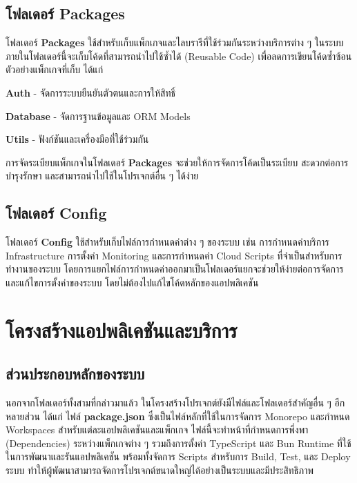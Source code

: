 \subsection{โฟลเดอร์ Packages}
\hspace*{1.5em}
โฟลเดอร์ \textbf{Packages} ใช้สำหรับเก็บแพ็กเกจและไลบรารีที่ใช้ร่วมกันระหว่างบริการต่าง ๆ ในระบบ ภายในโฟลเดอร์นี้จะเก็บโค้ดที่สามารถนำไปใช้ซ้ำได้ (Reusable Code) เพื่อลดการเขียนโค้ดซ้ำซ้อน 
ตัวอย่างแพ็กเกจที่เก็บ ได้แก่
\begin{mycustomenum2}
  \item \textbf{Auth} - จัดการระบบยืนยันตัวตนและการให้สิทธิ์
  \item \textbf{Database} - จัดการฐานข้อมูลและ ORM Models
  \item \textbf{Utils} - ฟังก์ชันและเครื่องมือที่ใช้ร่วมกัน
\end{mycustomenum2}
\hspace*{1.5em}
การจัดระเบียบแพ็กเกจในโฟลเดอร์ \textbf{Packages} จะช่วยให้การจัดการโค้ดเป็นระเบียบ สะดวกต่อการบำรุงรักษา และสามารถนำไปใช้ในโปรเจกต์อื่น ๆ ได้ง่าย

\subsection{โฟลเดอร์ Config}
\hspace*{1.5em}
โฟลเดอร์ \textbf{Config} ใช้สำหรับเก็บไฟล์การกำหนดค่าต่าง ๆ ของระบบ เช่น การกำหนดค่าบริการ Infrastructure การตั้งค่า Monitoring และการกำหนดค่า Cloud Scripts ที่จำเป็นสำหรับการทำงานของระบบ โดยการแยกไฟล์การกำหนดค่าออกมาเป็นโฟลเดอร์แยกจะช่วยให้ง่ายต่อการจัดการและแก้ไขการตั้งค่าของระบบ โดยไม่ต้องไปแก้ไขโค้ดหลักของแอปพลิเคชัน

\section{โครงสร้างแอปพลิเคชันและบริการ}
\subsection{ส่วนประกอบหลักของระบบ}
\hspace*{1.5em}
นอกจากโฟลเดอร์ทั้งสามที่กล่าวมาแล้ว ในโครงสร้างโปรเจกต์ยังมีไฟล์และโฟลเดอร์สำคัญอื่น ๆ อีกหลายส่วน ได้แก่ ไฟล์ \textbf{package.json} ซึ่งเป็นไฟล์หลักที่ใช้ในการจัดการ Monorepo และกำหนด Workspaces สำหรับแต่ละแอปพลิเคชันและแพ็กเกจ 
ไฟล์นี้จะทำหน้าที่กำหนดการพึ่งพา (Dependencies) ระหว่างแพ็กเกจต่าง ๆ รวมถึงการตั้งค่า TypeScript และ Bun Runtime ที่ใช้ในการพัฒนาและรันแอปพลิเคชัน พร้อมทั้งจัดการ Scripts สำหรับการ Build, Test, และ Deploy ระบบ ทำให้ผู้พัฒนาสามารถจัดการโปรเจกต์ขนาดใหญ่ได้อย่างเป็นระบบและมีประสิทธิภาพ


